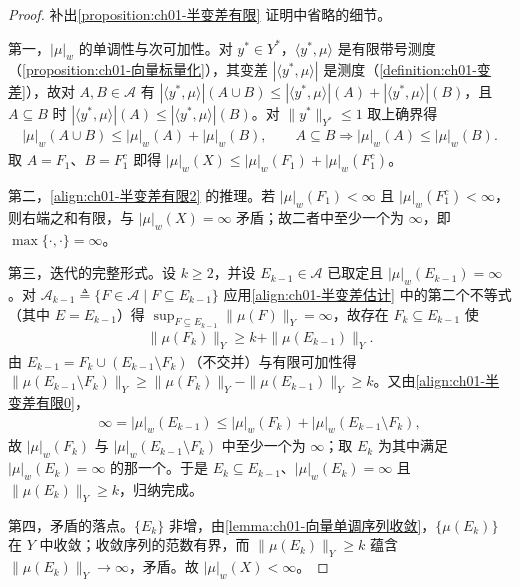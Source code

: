\documentclass[../../main.tex]{subfiles}%
\begin{document}
\begin{proof}
补出\cref{proposition:ch01-半变差有限} 证明中省略的细节。

第一，$|\mu|_w$ 的单调性与次可加性。对 $y^*\in Y^*$，$\langle y^*,\mu\rangle$ 是有限带号测度（\cref{proposition:ch01-向量标量化}），其变差 $\left|\langle y^*,\mu\rangle\right|$ 是测度（\cref{definition:ch01-变差}），故对 $A,B\in\mathcal{A}$ 有 $\left|\langle y^*,\mu\rangle\right|(A\cup B)\leqslant\left|\langle y^*,\mu\rangle\right|(A)+\left|\langle y^*,\mu\rangle\right|(B)$，且 $A\subseteq B$ 时 $\left|\langle y^*,\mu\rangle\right|(A)\leqslant\left|\langle y^*,\mu\rangle\right|(B)$。对 $\|y^*\|_{Y^*}\leqslant1$ 取上确界得
\begin{align}
|\mu|_w(A\cup B)\leqslant|\mu|_w(A)+|\mu|_w(B),\qquad A\subseteq B\Rightarrow|\mu|_w(A)\leqslant|\mu|_w(B). \label{align:ch01-半变差有限0}
\end{align}
取 $A=F_1$、$B=F_1^c$ 即得 $|\mu|_w(X)\leqslant|\mu|_w(F_1)+|\mu|_w(F_1^c)$。

第二，\eqref{align:ch01-半变差有限2} 的推理。若 $|\mu|_w(F_1)<\infty$ 且 $|\mu|_w(F_1^c)<\infty$，则右端之和有限，与 $|\mu|_w(X)=\infty$ 矛盾；故二者中至少一个为 $\infty$，即 $\max\{\cdot,\cdot\}=\infty$。

第三，迭代的完整形式。设 $k\geqslant 2$，并设 $E_{k-1}\in\mathcal{A}$ 已取定且 $|\mu|_w(E_{k-1})=\infty$。对 $\mathcal{A}_{k-1}\triangleq\{F\in\mathcal{A}\mid F\subseteq E_{k-1}\}$ 应用\eqref{align:ch01-半变差估计} 中的第二个不等式（其中 $E=E_{k-1}$）得 $\sup_{F\subseteq E_{k-1}}\|\mu(F)\|_Y=\infty$，故存在 $F_k\subseteq E_{k-1}$ 使
\begin{align*}
\|\mu(F_k)\|_Y\geqslant k+\|\mu(E_{k-1})\|_Y.
\end{align*}
由 $E_{k-1}=F_k\cup(E_{k-1}\setminus F_k)$（不交并）与有限可加性得 $\|\mu(E_{k-1}\setminus F_k)\|_Y\geqslant\|\mu(F_k)\|_Y-\|\mu(E_{k-1})\|_Y\geqslant k$。又由\eqref{align:ch01-半变差有限0}，
\begin{align*}
\infty=|\mu|_w(E_{k-1})\leqslant|\mu|_w(F_k)+|\mu|_w(E_{k-1}\setminus F_k),
\end{align*}
故 $|\mu|_w(F_k)$ 与 $|\mu|_w(E_{k-1}\setminus F_k)$ 中至少一个为 $\infty$；取 $E_k$ 为其中满足 $|\mu|_w(E_k)=\infty$ 的那一个。于是 $E_k\subseteq E_{k-1}$、$|\mu|_w(E_k)=\infty$ 且 $\|\mu(E_k)\|_Y\geqslant k$，归纳完成。

第四，矛盾的落点。$\{E_k\}$ 非增，由\cref{lemma:ch01-向量单调序列收敛}，$\{\mu(E_k)\}$ 在 $Y$ 中收敛；收敛序列的范数有界，而 $\|\mu(E_k)\|_Y\geqslant k$ 蕴含 $\|\mu(E_k)\|_Y\to\infty$，矛盾。故 $|\mu|_w(X)<\infty$。
\end{proof}
\end{document}
